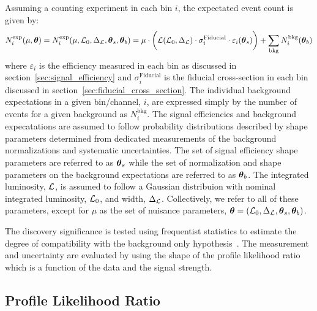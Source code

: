 Assuming a counting experiment in each bin $i$, the expectated event count is given by:
\begin{equation}
N^{\mathrm{exp}}_i(\mu,\boldsymbol{\theta}) = N^{\mathrm{exp}}_i(\mu,\mathcal{L}_0,\Delta_{\mathcal{L}},\boldsymbol{\theta}_s,\boldsymbol{\theta}_b) = \mu \cdot \bigg( \mathcal{L}(\mathcal{L}_0,\Delta_{\mathcal{L}}) \cdot \sigma^{\mathrm{Fiducial}}_i \cdot \varepsilon_i(\boldsymbol{\theta}_s) \bigg) + \sum_{\mathrm{bkg}} N_{i}^{\mathrm{bkg}}(\boldsymbol{\theta}_b)
\label{eq:poisson_expectation}
\end{equation}
where $\varepsilon_i$ is the efficiency 
measured in each bin as discussed in section~\ref{sec:signal_efficiency} and 
$\sigma^{\mathrm{Fiducial}}_i$ is the fiducial cross-section in each bin discussed in section~\ref{sec:fiducial_cross_section}. The 
individual background expectations in a given bin/channel, $i$, are expressed simply by the number of events
for a given background as $N^{\mathrm{bkg}}_i$. 
The signal efficiencies and background expecatations are assumed to follow probability distributions described by shape parameters determined from dedicated measurements of the background normalizations and systematic uncertainties.  
The set of signal efficiency shape parameters are referred to as $\boldsymbol{\theta}_s$ while the set of normalization and shape parameters on the background expectations are referred to as $\boldsymbol{\theta}_b$.
The integrated luminosity, $\mathcal{L}$, is assumed to follow 
a Gaussian distribuion with nominal integrated luminosity, $\mathcal{L}_0$, and width, $\Delta_{\mathcal{L}}$. 
Collectively, we refer to all of these parameters, except for $\mu$ as the set of nuisance parameters, $\boldsymbol{\theta} = (\mathcal{L}_0,\Delta_{\mathcal{L}}, \boldsymbol{\theta}_s, \boldsymbol{\theta}_b)$. 

The discovery significance is tested using frequentist statistics
to estimate the degree of compatibility with the background only hypothesis~\cite{Cowan:1277304}.
The measurement and uncertainty are evaluated 
by using the shape of the profile likelihood ratio~\cite{PDG:2014} 
which is a function of the data and the signal strength.

\subsection{Profile Likelihood Ratio}

